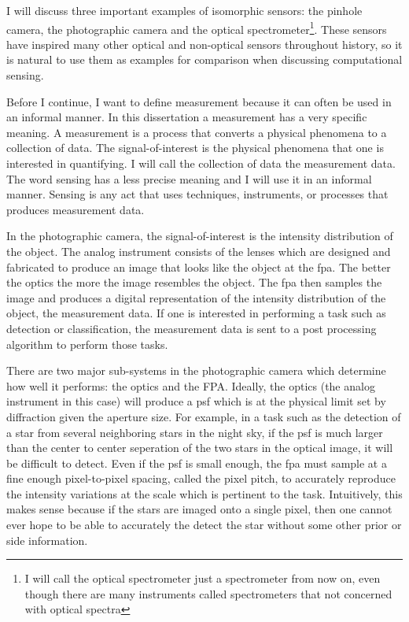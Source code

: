 I will discuss three important examples of isomorphic sensors: the pinhole camera, the photographic camera and the optical spectrometer\footnote{I will call the optical spectrometer just a spectrometer from now on, even though there are many instruments called spectrometers that not concerned with optical spectra}. These sensors have inspired many other optical and non-optical sensors throughout history, so it is natural to use them as examples for comparison when discussing computational sensing. 

Before I continue, I want to define \gls{measurement} because it can often be used in an informal manner. In this dissertation a \gls{measurement} has a very specific meaning. A \gls{measurement} is a process that converts a physical phenomena to a collection of data. The signal-of-interest is the physical phenomena that one is interested in quantifying. I will call the collection of data the measurement data.  The word sensing has a less precise meaning and I will use it in an informal manner. Sensing is any act that uses techniques, instruments, or processes that produces measurement data. 

In the photographic camera, the signal-of-interest is the intensity distribution of the object. The analog instrument consists of the lenses which are designed and fabricated to produce an image that looks like the object at the \gls{fpa}. The better the optics the more the image resembles the object. The \gls{fpa} then samples the image and produces a digital representation of the intensity distribution of the object, the measurement data. If one is interested in performing a task such as detection or classification, the measurement data is sent to a post processing algorithm to perform those tasks. 

There are two major sub-systems in the photographic camera which determine how well it performs: the optics and the FPA. Ideally, the optics (the analog instrument in this case) will produce a \gls{psf} which is at the physical limit set by diffraction given the aperture size. For example, in a task such as the detection of a star from several neighboring stars in the night sky, if the \gls{psf} is much larger than the center to center seperation of the two stars in the optical image, it will be difficult to detect. Even if the \gls{psf} is small enough, the \gls{fpa} must sample at a fine enough pixel-to-pixel spacing, called the \gls{pixel pitch}, to accurately reproduce the intensity variations at the scale which is pertinent to the task. Intuitively, this makes sense because if the stars are imaged onto a single pixel, then one cannot ever hope to be able to accurately the detect the star without some other prior or side information. 

